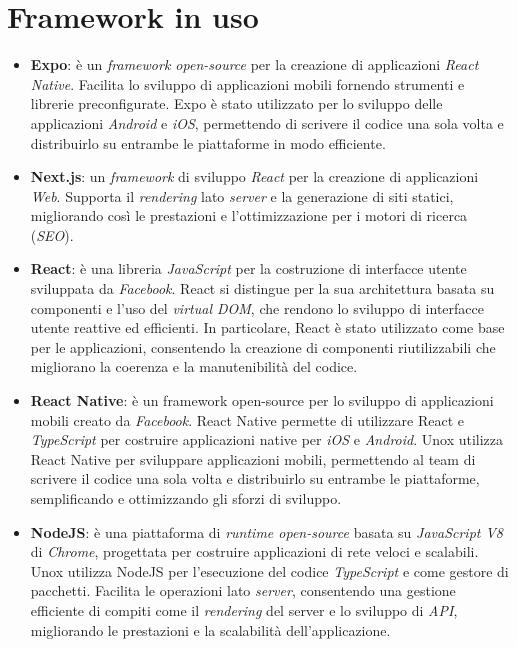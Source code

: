 \section{Framework in uso}
\begin{itemize}
    \item \textbf{Expo}: è un \textit{framework open-source} per la creazione di applicazioni \textit{React Native}. Facilita lo sviluppo di applicazioni mobili fornendo strumenti e librerie preconfigurate.
    Expo è stato utilizzato per lo sviluppo delle applicazioni \textit{Android} e \textit{iOS}, permettendo di scrivere il codice una sola volta e distribuirlo su entrambe le piattaforme in modo efficiente.
    \item \textbf{Next.js}: un \textit{framework} di sviluppo \textit{React} per la creazione di applicazioni \textit{Web}. Supporta il \textit{rendering} lato \textit{server} e la generazione di siti statici, migliorando così le prestazioni e l'ottimizzazione per i motori di ricerca (\textit{SEO}).
    \item \textbf{React}: è una libreria \textit{JavaScript} per la costruzione di interfacce utente sviluppata da \textit{Facebook}. React si distingue per la sua architettura basata su componenti e l'uso del \textit{virtual DOM}, che rendono lo sviluppo di interfacce utente reattive ed efficienti. In particolare, React è stato utilizzato come base per le applicazioni, consentendo la creazione di componenti riutilizzabili che migliorano la coerenza e la manutenibilità del codice.
    \item \textbf{React Native}: è un framework open-source per lo sviluppo di applicazioni mobili creato da \textit{Facebook}. React Native permette di utilizzare React e \textit{TypeScript} per costruire applicazioni native per \textit{iOS} e \textit{Android}. Unox utilizza React Native per sviluppare applicazioni mobili, permettendo al team di scrivere il codice una sola volta e distribuirlo su entrambe le piattaforme, semplificando e ottimizzando gli sforzi di sviluppo.
    \item \textbf{NodeJS}: è una piattaforma di \textit{runtime open-source} basata su \textit{JavaScript V8} di \textit{Chrome}, progettata per costruire applicazioni di rete veloci e scalabili. Unox utilizza NodeJS per l'esecuzione del codice \textit{TypeScript} e come gestore di pacchetti. Facilita le operazioni lato \textit{server}, consentendo una gestione efficiente di compiti come il \textit{rendering} del server e lo sviluppo di \textit{API}, migliorando le prestazioni e la scalabilità dell'applicazione.
\end{itemize}

